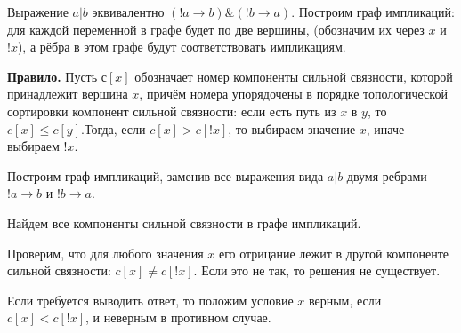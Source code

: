Выражение $a | b$ эквивалентно $(!a \rightarrow b) \& (!b \rightarrow a)$. Построим
граф импликаций: для каждой переменной в графе будет по две вершины, (обозначим
их через $x$ и $!x$), а рёбра в этом графе будут соответствовать импликациям.

\textbf{Правило.} Пусть $с[x]$ обозначает номер компоненты сильной связности,
которой принадлежит вершина $x$, причём номера упорядочены в порядке топологической
сортировки компонент сильной связности: если есть путь из $x$ в $y$, то
$c[x] \leq c[y]$.Тогда, если $c[x] > c[!x]$, то выбираем значение $x$, иначе выбираем
$!x$.

\begin { enumerate } \item Построим граф импликаций, заменив все выражения вида
$a | b$ двумя ребрами $!a \rightarrow b$ и $!b \rightarrow a$. \item Найдем все
компоненты сильной связности в графе импликаций. \item Проверим, что для любого
значения $x$ его отрицание лежит в другой компоненте сильной связности:
$c[x] \neq c[!x]$. Если это не так, то решения не существует. \item Если
требуется выводить ответ, то положим условие $x$ верным, если $c[x] < c[!x]$, и неверным
в противном случае. \end { enumerate }
